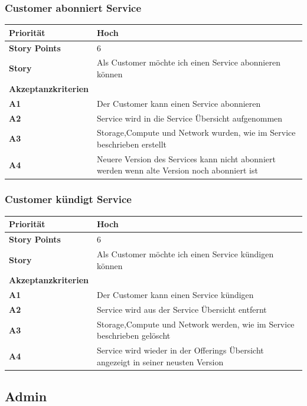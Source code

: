 \documentclass[11pt]{scrartcl}
\begin{document}
 \subsubsection{Customer abonniert Service}
\begin{tabularx}{\linewidth}{l X}
  \textbf{Priorität} & Hoch\\
  \hline
  \textbf{Story Points} & 6\\
  \hline
  \textbf{Story}& Als Customer möchte ich einen Service abonnieren können\\
  \hline
    \textbf{Akzeptanzkriterien} & \\
    \hline
  \textbf{A1} & Der Customer kann einen Service abonnieren\\
  \hline
  \textbf{A2} & Service wird in die Service Übersicht aufgenommen\\
  \hline
    \textbf{A3} & Storage,Compute und Network wurden, wie im Service beschrieben erstellt\\
  \hline
      \textbf{A4} & Neuere Version des Services kann nicht abonniert werden wenn alte Version noch abonniert ist\\
  \hline
   \end{tabularx}
 \subsubsection{Customer kündigt Service}
 \begin{tabularx}{\linewidth}{l X}
     \textbf{Priorität} & Hoch\\
  \hline
  \textbf{Story Points} & 6\\
  \hline
  \textbf{Story}& Als Customer möchte ich einen Service kündigen können\\
  \hline
    \textbf{Akzeptanzkriterien} & \\
    \hline
  \textbf{A1} & Der Customer kann einen Service kündigen\\
  \hline
  \textbf{A2} & Service wird aus der Service Übersicht entfernt\\
  \hline
    \textbf{A3} & Storage,Compute und Network werden, wie im Service beschrieben gelöscht\\
  \hline
      \textbf{A4} & Service wird wieder in der Offerings Übersicht angezeigt in seiner neusten Version\\
  \hline
   \end{tabularx}
  
 \subsection{Admin}
\end{document}
